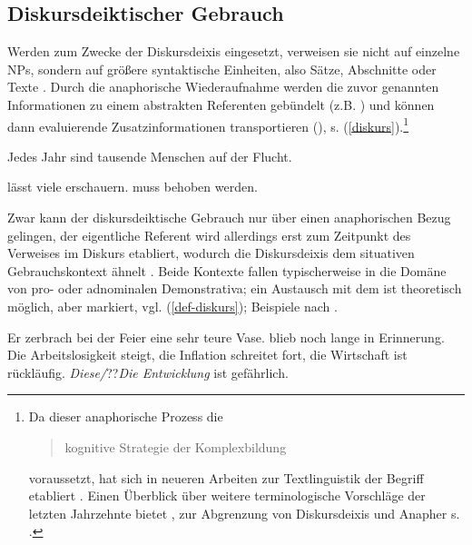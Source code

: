 \subsection{Diskursdeiktischer Gebrauch}\label{diskurs-deikt}

Werden  zum Zwecke der Diskursdeixis  eingesetzt, verweisen sie nicht auf einzelne  NPs, sondern auf größere syntaktische Einheiten, also Sätze, Abschnitte oder Texte \parencite{Webber1991,Fraurud1992, Fillmore1997, Diessel1999, Consten2007, Consten2009, Marx2011}. Durch die anaphorische  Wiederaufnahme werden die zuvor genannten Informationen zu einem abstrakten Referenten gebündelt (z.B. ) und können dann evaluierende Zusatzinformationen transportieren (),  s. (\ref{diskurs}).\footnote{Da dieser anaphorische  Prozess die \blockcquote[129]{Schwarz2000}{kognitive Strategie der Komplexbildung} voraussetzt, hat sich in neueren Arbeiten zur Textlinguistik der Begriff  etabliert \parencite[s. z.b.][]{Consten2007, Consten2009}. Einen Überblick über weitere terminologische Vorschläge der letzten Jahrzehnte bietet \textcite[16--17]{Marx2011}, zur Abgrenzung von Diskursdeixis  und Anapher  s. \textcite[30--31]{Consten2004}.} 

 \begin{exe}
	\ex \label{diskurs}  Jedes Jahr sind tausende Menschen auf der Flucht.
	\begin{xlist}
		\ex \label{propo}  lässt viele erschauern.
			\ex \label{bewertung}  muss behoben werden.
		\end{xlist}
\end{exe}

Zwar kann der diskursdeiktische Gebrauch nur über einen anaphorischen  Bezug gelingen, der eigentliche Referent wird allerdings erst zum Zeitpunkt des Verweises im Diskurs etabliert, wodurch die Diskursdeixis dem situativen  Gebrauchskontext ähnelt \parencite[224]{Himmelmann1996}. Beide Kontexte fallen typischerweise in die Domäne von pro- oder adnominalen Demonstrativa; ein Austausch mit dem  ist theoretisch möglich, aber markiert, vgl. (\ref{def-diskurs}); Beispiele nach  \textcite[130--131]{Schwarz2000}.  

 \begin{exe}
	\ex \label{def-diskurs} 
	\begin{xlist}
		\ex \label{ex:tassen} Er zerbrach bei der Feier eine sehr teure Vase.  blieb noch lange in Erinnerung. 
			\ex \label{ex:entwicklung} Die Arbeitslosigkeit steigt, die Inflation schreitet fort, die Wirtschaft ist rückläufig. \textit{Diese/}??\textit{Die Entwicklung} ist gefährlich. 
		\end{xlist}
\end{exe}

